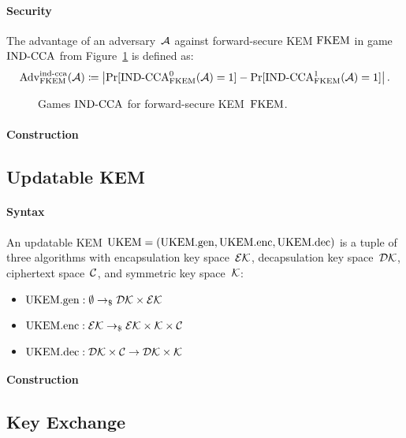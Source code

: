 \documentclass[a4paper,orivec]{llncs}
\begin{document}
\paragraph{Security}
The advantage of an adversary~$\mathcal{A}$ against forward-secure KEM $\mathrm{FKEM}$ in game ${\mathrm{IND}\text{-}\mathrm{CCA}}$ from Figure~\ref{fig:fkem:ind} is defined as:
\[
\mathrm{Adv}_{\mathrm{FKEM}}^{\mathrm{ind}\text{-}\mathrm{cca}}(\mathcal{A})\coloneqq\left|\Pr[{\mathrm{IND}\text{-}\mathrm{CCA}}_{\mathrm{FKEM}}^0(\mathcal{A})=1]-\Pr[{\mathrm{IND}\text{-}\mathrm{CCA}}_{\mathrm{FKEM}}^1(\mathcal{A})=1]\right|\text{.}
\]

\begin{figure}[!ht]
    \centering
    \nicoresetlinenr%
    \fbox{%
        \scalebox{\codescalefactor}{%
        }%
    }
    \caption{%
        Games ${\mathrm{IND}\text{-}\mathrm{CCA}}$ for forward-secure KEM~$\mathrm{FKEM}$.
    }
    \label{fig:fkem:ind}
\end{figure}

\paragraph{Construction}


\subsection{Updatable KEM}

\paragraph{Syntax}
An updatable KEM $\mathrm{UKEM}=(\mathrm{UKEM}.\mathrm{gen},\mathrm{UKEM}.\mathrm{enc},\mathrm{UKEM}.\mathrm{dec})$ is a tuple of three algorithms with encapsulation key space~$\mathcal{EK}$, decapsulation key space~$\mathcal{DK}$, ciphertext space~$\mathcal{C}$, and symmetric key space~$\mathcal{K}$:

\begin{itemize}
    \item $\mathrm{UKEM}.\mathrm{gen}: \emptyset \to_\$ \mathcal{DK}\times\mathcal{EK}$
    \item $\mathrm{UKEM}.\mathrm{enc}: \mathcal{EK} \to_\$ \mathcal{EK}\times\mathcal{K}\times\mathcal{C}$
    \item $\mathrm{UKEM}.\mathrm{dec}: \mathcal{DK}\times\mathcal{C} \to \mathcal{DK}\times\mathcal{K}$
\end{itemize}

\paragraph{Construction}


\subsection{Key Exchange}
\end{document}
